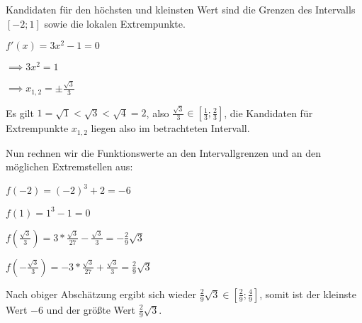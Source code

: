 \item

Kandidaten für den höchsten und kleinsten Wert sind die Grenzen des Intervalls $[-2;1]$ sowie die lokalen Extrempunkte.

$f'(x) = 3x^2-1 = 0$

$\implies 3x^2 = 1$

$\implies x_{1,2} = \pm \frac{\sqrt{3}}{3}$

Es gilt $1 = \sqrt{1} < \sqrt{3} < \sqrt{4} = 2$, also $\frac{\sqrt{3}}{3} \in [\frac{1}{3}; \frac{2}{3}]$, die Kandidaten für Extrempunkte $x_{1,2}$ liegen also im betrachteten Intervall.

Nun rechnen wir die Funktionswerte an den Intervallgrenzen und an den möglichen Extremstellen aus:

$f(-2) = (-2)^3 + 2 = -6$

$f(1) = 1^3 - 1 = 0$

$f(\frac{\sqrt{3}}{3}) = 3*\frac{\sqrt{3}}{27} - \frac{\sqrt{3}}{3} = -\frac{2}{9}\sqrt{3}$

$f(-\frac{\sqrt{3}}{3}) = -3*\frac{\sqrt{3}}{27} + \frac{\sqrt{3}}{3} = \frac{2}{9}\sqrt{3}$

Nach obiger Abschätzung ergibt sich wieder $\frac{2}{9}\sqrt{3} \in [\frac{2}{9};\frac{4}{9}]$, somit ist der kleinste Wert $-6$ und der größte Wert $\frac{2}{9}\sqrt{3}$.

